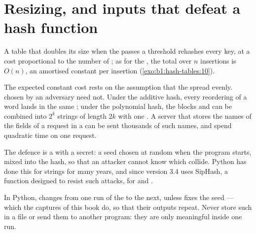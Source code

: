 \section{Resizing, and inputs that defeat a hash function}\label{sec:b1:hash-tables:resizing}

A table that doubles its size when the  passes a threshold rehashes every key, at a cost proportional to the
number of ; as for the , the total over $n$ insertions is $O(n)$, an amortised constant per insertion
(\cref{exo:b1:hash-tables:10}).

\label{out:b1:hash-tables:resize}

The expected constant cost rests on the assumption that the  spread evenly.  chosen by an adversary need not.
Under the additive hash, every reordering of a word lands in the same ; under the polynomial hash, the blocks
 and  can be combined into $2^k$ strings of length $2k$ with one . A server that stores the
names of the fields of a request in a  can be sent thousands of such names, and spend quadratic time on one
request.

\label{out:b1:hash-tables:attack}

The defence is a  with a secret: a seed chosen at random when the program starts, mixed into the hash, so
that an attacker cannot know which  collide. Python has done this for strings for many years, and since version 3.4
uses SipHash, a function designed to resist such attacks, for  and .

\begin{inpractice}
In Python,  changes from one run of the  to the next, unless  fixes the
seed --- which the captures of this book do, so that their outputs repeat. Never store such  in a file or
send them to another program: they are only meaningful inside one run.
\end{inpractice}

